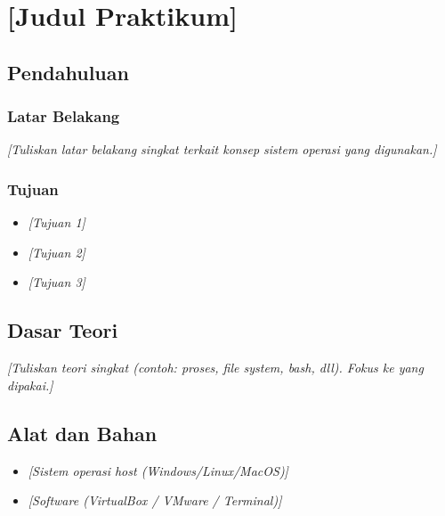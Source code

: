 
\chapter{[Judul Praktikum]}
\label{chap:handson-x}

\section{Pendahuluan}

\subsection{Latar Belakang}
\noindent
\textit{[Tuliskan latar belakang singkat terkait konsep sistem operasi yang digunakan.]}

\subsection{Tujuan}
\begin{itemize}
    \item \textit{[Tujuan 1]}
    \item \textit{[Tujuan 2]}
    \item \textit{[Tujuan 3]}
\end{itemize}

\section{Dasar Teori}

\noindent
\textit{[Tuliskan teori singkat (contoh: proses, file system, bash, dll). Fokus ke yang dipakai.]}

\section{Alat dan Bahan}

\begin{itemize}
    \item \textit{[Sistem operasi host (Windows/Linux/MacOS)]}
    \item \textit{[Software (VirtualBox / VMware / Terminal)]}
\end{itemize}

